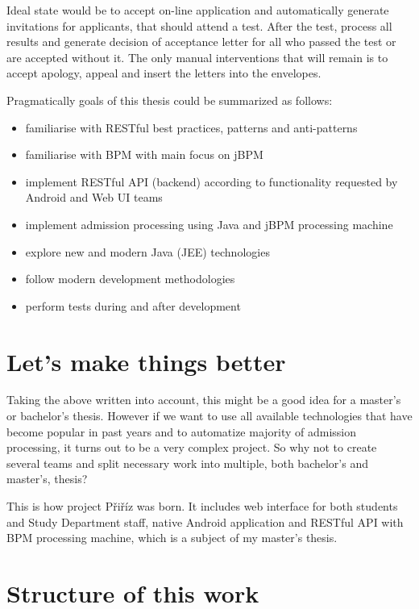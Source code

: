 \begin{introduction}
	Ideal state would be to accept on-line application and automatically generate invitations for applicants, that should
	attend a test. After the test, process all results and generate decision of acceptance letter for all who passed the
	test or are accepted without it. The only manual interventions that will remain is to accept apology, appeal and insert
	the letters into the envelopes.

	Pragmatically goals of this thesis could be summarized as follows:
	
	\begin{itemize}
	  \item familiarise with RESTful best practices, patterns and anti-patterns
	  \item familiarise with BPM with main focus on jBPM
	  \item implement RESTful API (backend) according to functionality requested by Android and Web UI teams
	  \item implement admission processing using Java and jBPM processing machine
	  \item explore new and modern Java (JEE) technologies
	  \item follow modern development methodologies
	  \item perform tests during and after development
	\end{itemize}
	
	\section{Let's make things better}
	
	Taking the above written into account, this might be a good idea for a master's or bachelor's thesis. However if we
	want to use all available technologies that have become popular in past years and to automatize majority of admission
	processing, it turns out to be a very complex project. So why not to create several teams and split necessary work into
	multiple, both bachelor's and master's, thesis?
	
	This is how project Přiříz was born. It includes web interface for both students and Study Department staff, native
	Android application and RESTful API with BPM processing machine, which is a subject of my master's thesis.
	
	\section{Structure of this work}
	

\end{introduction}
